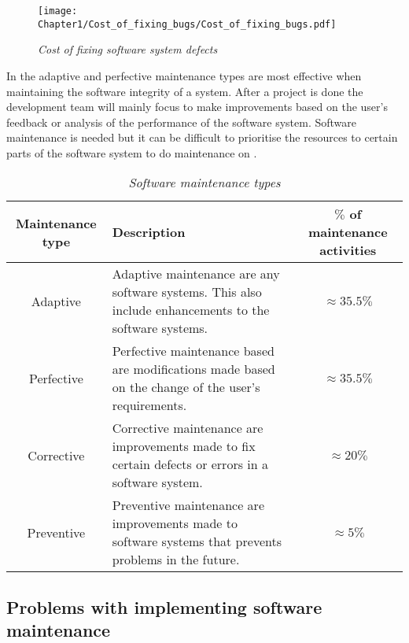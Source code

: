 \begin{figure}[!htb] %
	\centering %
	\texttt{[image: Chapter1/Cost\_of\_fixing\_bugs/Cost\_of\_fixing\_bugs.pdf]}
	\caption[Cost of fixing software system defects]
	{\textit{Cost of fixing software system defects \cite{Ogheneovo2014}}}\label{fig:CH1_Costs_of_fixing_bugs}
\end{figure} 

In  the adaptive and perfective maintenance types are most effective when maintaining the software integrity of a system. After a project is done the development team will mainly focus to make improvements based on the user's feedback or analysis of the performance of the software system. Software maintenance is needed but it can be difficult to prioritise the resources to certain parts of the software system to do maintenance on \cite{Mamone1994, Hasan2012}.

\begin{table}[!htb]
	\centering
	\small
	\caption[Software maintenance types]
	{\textit{Software maintenance types}}
	\label{tbl:CH1_MaintenanceTypes}
	\begin{tabularx}{\textwidth}{|c|X|c|}
		\hline
		\textbf{Maintenance type} & \textbf{Description} & \textbf{$\%$ of maintenance activities} \\ \hline
		Adaptive & \raggedright Adaptive maintenance are any software systems. This also include enhancements to the software systems. & $\approx 35.5\%$ \\ \hline
		Perfective & Perfective maintenance based are modifications made based on the change of the user's requirements. & $\approx 35.5\%$ \\ \hline
		Corrective & \raggedright Corrective maintenance are improvements made to fix certain defects or errors in a software system. & $\approx 20\%$ \\ \hline
		Preventive & \raggedright  Preventive maintenance are improvements made to software systems that prevents problems in the future. & $\approx 5\%$ \\ \hline
	\end{tabularx}
\end{table}

\subsection{Problems with implementing software maintenance}\label{sec:Maintenance_problems}


